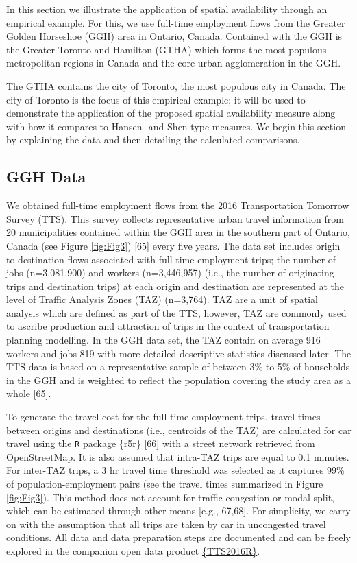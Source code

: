 \documentclass[10pt,letterpaper]{article}
\begin{document}
In this section we illustrate the application of spatial availability
through an empirical example. For this, we use full-time employment
flows from the Greater Golden Horseshoe (GGH) area in Ontario, Canada.
Contained with the GGH is the Greater Toronto and Hamilton (GTHA) which
forms the most populous metropolitan regions in Canada and the core
urban agglomeration in the GGH.

The GTHA contains the city of Toronto, the most populous city in Canada.
The city of Toronto is the focus of this empirical example; it will be
used to demonstrate the application of the proposed spatial availability
measure along with how it compares to Hansen- and Shen-type measures. We
begin this section by explaining the data and then detailing the
calculated comparisons.

\hypertarget{ggh-data}{%
\subsection{GGH Data}\label{ggh-data}}

We obtained full-time employment flows from the 2016 Transportation
Tomorrow Survey (TTS). This survey collects representative urban travel
information from 20 municipalities contained within the GGH area in the
southern part of Ontario, Canada (see Figure \ref{fig:Fig3}) {[}65{]}
every five years. The data set includes origin to destination flows
associated with full-time employment trips; the number of jobs
(n=3,081,900) and workers (n=3,446,957) (i.e., the number of originating
trips and destination trips) at each origin and destination are
represented at the level of Traffic Analysis Zones (TAZ) (n=3,764). TAZ
are a unit of spatial analysis which are defined as part of the TTS,
however, TAZ are commonly used to ascribe production and attraction of
trips in the context of transportation planning modelling. In the GGH
data set, the TAZ contain on average 916 workers and jobs 819 with more
detailed descriptive statistics discussed later. The TTS data is based
on a representative sample of between 3\% to 5\% of households in the
GGH and is weighted to reflect the population covering the study area as
a whole {[}65{]}.

To generate the travel cost for the full-time employment trips, travel
times between origins and destinations (i.e., centroids of the TAZ) are
calculated for car travel using the \texttt{R} package \{r5r\} {[}66{]}
with a street network retrieved from OpenStreetMap. It is also assumed
that intra-TAZ trips are equal to 0.1 minutes. For inter-TAZ trips, a 3
hr travel time threshold was selected as it captures 99\% of
population-employment pairs (see the travel times summarized in Figure
\ref{fig:Fig3}). This method does not account for traffic congestion or
modal split, which can be estimated through other means {[}e.g.,
67,68{]}. For simplicity, we carry on with the assumption that all trips
are taken by car in uncongested travel conditions. All data and data
preparation steps are documented and can be freely explored in the
companion open data product
\href{https://soukhova.github.io/TTS2016R/}{\{TTS2016R\}}.
\end{document}
